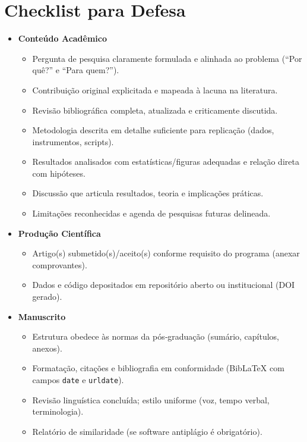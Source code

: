 \chapter{Checklist para Defesa}

\begin{itemize}[label=\(\square\),leftmargin=*]

  \item \textbf{Conteúdo Acadêmico}
    \begin{itemize}[label=\(\square\),leftmargin=2em,nosep]
      \item Pergunta de pesquisa claramente formulada e alinhada ao problema (``Por quê?'' e ``Para quem?'').
      \item Contribuição original explicitada e mapeada à lacuna na literatura.
      \item Revisão bibliográfica completa, atualizada e criticamente discutida.
      \item Metodologia descrita em detalhe suficiente para replicação (dados, instrumentos, scripts).
      \item Resultados analisados com estatísticas/figuras adequadas e relação direta com hipóteses.
      \item Discussão que articula resultados, teoria e implicações práticas.
      \item Limitações reconhecidas e agenda de pesquisas futuras delineada.
    \end{itemize}

  \item \textbf{Produção Científica}
    \begin{itemize}[label=\(\square\),leftmargin=2em,nosep]
      \item Artigo(s) submetido(s)/aceito(s) conforme requisito do programa (anexar comprovantes).
      \item Dados e código depositados em repositório aberto ou institucional (DOI gerado).
    \end{itemize}

  \item \textbf{Manuscrito}
    \begin{itemize}[label=\(\square\),leftmargin=2em,nosep]
      \item Estrutura obedece às normas da pós‑graduação (sumário, capítulos, anexos).
      \item Formatação, citações e bibliografia em conformidade (BibLaTeX com campos \texttt{date} e \texttt{urldate}).
      \item Revisão linguística concluída; estilo uniforme (voz, tempo verbal, terminologia).
      \item Relatório de similaridade  (se software antiplágio é obrigatório).
    \end{itemize}


\end{itemize}
